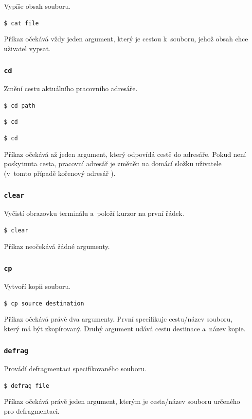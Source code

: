 \documentclass[12pt]{article}
\begin{document}
Vypíše obsah souboru.

\texttt{\$ cat file}

Příkaz očekává vždy jeden argument, který je cestou k~souboru, jehož obsah chce uživatel vypsat.

\subsubsection{\texttt{cd}}\label{sec:cd}

Změní cestu aktuálního pracovního adresáře.

\texttt{\$ cd path}

\texttt{\$ cd \/}

\texttt{\$ cd}

Příkaz očekává až jeden argument, který odpovídá cestě do adresáře.
Pokud není poskytnuta cesta, pracovní adresář je změněn na domácí složku uživatele (v~tomto případě kořenový adresář \texttt{\/}).

\subsubsection{\texttt{clear}}\label{sec:clear}

Vyčistí obrazovku terminálu a~položí kurzor na první řádek.

\texttt{\$ clear}

Příkaz neočekává žádné argumenty.

\subsubsection{\texttt{cp}}\label{sec:cp}

Vytvoří kopii souboru.

\texttt{\$ cp source destination}

Příkaz očekává právě dva argumenty.
První specifikuje cestu/název souboru, který má být zkopírovaný.
Druhý argument udává cestu destinace a~název kopie.

\subsubsection{\texttt{defrag}}\label{sec:defrag}

Provádí defragmentaci specifikovaného souboru.

\texttt{\$ defrag file}

Příkaz očekává právě jeden argument, kterým je cesta/název souboru určeného pro defragmentaci.
\end{document}
